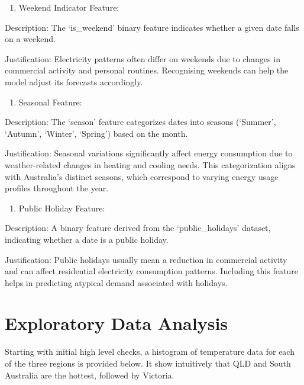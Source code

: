 \documentclass[mstat,12pt]{unswthesis}
\providecommand{\tightlist}{%
  \setlength{\itemsep}{0pt}\setlength{\parskip}{0pt}}
\begin{document}
\begin{enumerate}
\def\labelenumi{\arabic{enumi}.}
\setcounter{enumi}{2}
\tightlist
\item
  Weekend Indicator Feature:
\end{enumerate}

Description: The `is\_weekend' binary feature indicates whether a given
date falls on a weekend.

Justification: Electricity patterns often differ on weekends due to
changes in commercial activity and personal routines. Recognising
weekends can help the model adjust its forecasts accordingly.

\begin{enumerate}
\def\labelenumi{\arabic{enumi}.}
\setcounter{enumi}{3}
\tightlist
\item
  Seasonal Feature:
\end{enumerate}

Description: The `season' feature categorizes dates into seasons
(`Summer', `Autumn', `Winter', `Spring') based on the month.

Justification: Seasonal variations significantly affect energy
consumption due to weather-related changes in heating and cooling needs.
This categorization aligns with Australia's distinct seasons, which
correspond to varying energy usage profiles throughout the year.

\begin{enumerate}
\def\labelenumi{\arabic{enumi}.}
\setcounter{enumi}{4}
\tightlist
\item
  Public Holiday Feature:
\end{enumerate}

Description: A binary feature derived from the `public\_holidays'
dataset, indicating whether a date is a public holiday.

Justification: Public holidays usually mean a reduction in commercial
activity and can affect residential electricity consumption patterns.
Including this feature helps in predicting atypical demand associated
with holidays.

\section{Exploratory Data Analysis}\label{exploratory-data-analysis}

Starting with initial high level checks, a histogram of temperature data
for each of the three regions is provided below. It show intuitively
that QLD and South Australia are the hottest, followed by Victoria.
\end{document}
